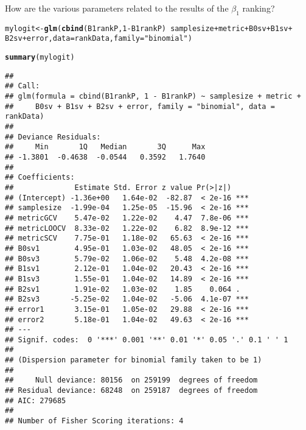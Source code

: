 \documentclass{article}\usepackage[]{graphicx}\usepackage[]{color}
\makeatletter
\newcommand{\hlnum}[1]{\textcolor[rgb]{0.686,0.059,0.569}{#1}}%
\newcommand{\hlstr}[1]{\textcolor[rgb]{0.192,0.494,0.8}{#1}}%
\newcommand{\hlopt}[1]{\textcolor[rgb]{0,0,0}{#1}}%
\newcommand{\hlstd}[1]{\textcolor[rgb]{0.345,0.345,0.345}{#1}}%
\newcommand{\hlkwb}[1]{\textcolor[rgb]{0.69,0.353,0.396}{#1}}%
\newcommand{\hlkwc}[1]{\textcolor[rgb]{0.333,0.667,0.333}{#1}}%
\newcommand{\hlkwd}[1]{\textcolor[rgb]{0.737,0.353,0.396}{\textbf{#1}}}%
\newenvironment{kframe}{%
 \def\at@end@of@kframe{}%
 \ifinner\ifhmode%
  \def\at@end@of@kframe{\end{minipage}}%
  \begin{minipage}{\columnwidth}%
 \fi\fi%
 \def\FrameCommand##1{\hskip\@totalleftmargin \hskip-\fboxsep
 \colorbox{shadecolor}{##1}\hskip-\fboxsep
     \hskip-\linewidth \hskip-\@totalleftmargin \hskip\columnwidth}%
 \MakeFramed {\advance\hsize-\width
   \@totalleftmargin\z@ \linewidth\hsize
   \@setminipage}}%
 {\par\unskip\endMakeFramed%
 \at@end@of@kframe}
\newenvironment{knitrout}{}{} %
\makeatother
\begin{document}
How are the various parameters related to the results of the $\beta _1$ ranking?
\begin{knitrout}
\color{fgcolor}\begin{kframe}
\begin{alltt}
\hlstd{mylogit} \hlkwb{<-} \hlkwd{glm}\hlstd{(}\hlkwd{cbind}\hlstd{(B1rankP,} \hlnum{1} \hlopt{-} \hlstd{B1rankP)} \hlopt{~} \hlstd{samplesize} \hlopt{+} \hlstd{metric} \hlopt{+} \hlstd{B0sv} \hlopt{+} \hlstd{B1sv} \hlopt{+}
    \hlstd{B2sv} \hlopt{+} \hlstd{error,} \hlkwc{data} \hlstd{= rankData,} \hlkwc{family} \hlstd{=} \hlstr{"binomial"}\hlstd{)}
\end{alltt}


{\ttfamily\noindent\color{warningcolor}{\#\# Warning: non-integer counts in a binomial glm!}}\begin{alltt}
\hlkwd{summary}\hlstd{(mylogit)}
\end{alltt}
\begin{verbatim}
## 
## Call:
## glm(formula = cbind(B1rankP, 1 - B1rankP) ~ samplesize + metric + 
##     B0sv + B1sv + B2sv + error, family = "binomial", data = rankData)
## 
## Deviance Residuals: 
##     Min       1Q   Median       3Q      Max  
## -1.3801  -0.4638  -0.0544   0.3592   1.7640  
## 
## Coefficients:
##              Estimate Std. Error z value Pr(>|z|)    
## (Intercept) -1.36e+00   1.64e-02  -82.87  < 2e-16 ***
## samplesize  -1.99e-04   1.25e-05  -15.96  < 2e-16 ***
## metricGCV    5.47e-02   1.22e-02    4.47  7.8e-06 ***
## metricLOOCV  8.33e-02   1.22e-02    6.82  8.9e-12 ***
## metricSCV    7.75e-01   1.18e-02   65.63  < 2e-16 ***
## B0sv1        4.95e-01   1.03e-02   48.05  < 2e-16 ***
## B0sv3        5.79e-02   1.06e-02    5.48  4.2e-08 ***
## B1sv1        2.12e-01   1.04e-02   20.43  < 2e-16 ***
## B1sv3        1.55e-01   1.04e-02   14.89  < 2e-16 ***
## B2sv1        1.91e-02   1.03e-02    1.85    0.064 .  
## B2sv3       -5.25e-02   1.04e-02   -5.06  4.1e-07 ***
## error1       3.15e-01   1.05e-02   29.88  < 2e-16 ***
## error2       5.18e-01   1.04e-02   49.63  < 2e-16 ***
## ---
## Signif. codes:  0 '***' 0.001 '**' 0.01 '*' 0.05 '.' 0.1 ' ' 1
## 
## (Dispersion parameter for binomial family taken to be 1)
## 
##     Null deviance: 80156  on 259199  degrees of freedom
## Residual deviance: 68248  on 259187  degrees of freedom
## AIC: 279685
## 
## Number of Fisher Scoring iterations: 4
\end{verbatim}
\end{kframe}
\end{knitrout}
\end{document}

